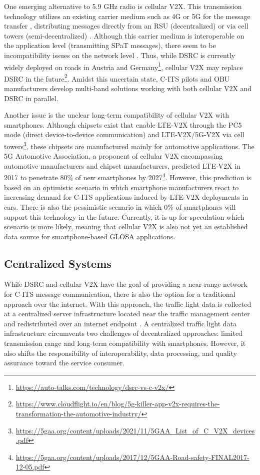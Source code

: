 One emerging alternative to 5.9 GHz radio is cellular V2X. This transmission technology utilizes an existing carrier medium such as 4G or 5G for the message transfer \cite{xia_field_2012, zweck_traffic_2013, bhattacharyya_assessing_2022}, distributing messages directly from an RSU (decentralized) \cite{bohm_radio_2017} or via cell towers (semi-decentralized) \cite{strobl_c-its_2019, jacob_ivs-kom_2020}. Although this carrier medium is interoperable on the application level (transmitting SPaT messages), there seem to be incompatibility issues on the network level \cite{bohm_radio_2017}. Thus, while DSRC is currently widely deployed on roads in Austria and Germany\footnote{\url{https://auto-talks.com/technology/dsrc-vs-c-v2x/}}, cellular V2X may replace DSRC in the future\footnote{\label{cloudflight-article}\url{https://www.cloudflight.io/en/blog/5g-killer-app-v2x-requires-the-transformation-the-automotive-industry/}}. Amidst this uncertain state, C-ITS pilots \cite{strobl_c-its_2019} and OBU manufacturers \cite{jacob_ivs-kom_2020} develop multi-band solutions working with both cellular V2X and DSRC in parallel.

Another issue is the unclear long-term compatibility of cellular V2X with smartphones. Although chipsets exist that enable LTE-V2X through the PC5 mode (direct device-to-device communication) and LTE-V2X/5G-V2X via cell towers\footnote{\url{https://5gaa.org/content/uploads/2021/11/5GAA_List_of_C_V2X_devices.pdf}}, these chipsets are manufactured mainly for automotive applications. The 5G Automotive Association, a proponent of cellular V2X encompassing automotive manufacturers and chipset manufacturers, predicted LTE-V2X in 2017 to penetrate 80\% of new smartphones by 2027\footnote{\url{https://5gaa.org/content/uploads/2017/12/5GAA-Road-safety-FINAL2017-12-05.pdf}}. However, this prediction is based on an optimistic scenario in which smartphone manufacturers react to increasing demand for C-ITS applications induced by LTE-V2X deployments in cars. There is also the pessimistic scenario in which 0\% of smartphones will support this technology in the future. Currently, it is up for speculation which scenario is more likely, meaning that cellular V2X is also not yet an established data source for smartphone-based GLOSA applications.

\subsection{Centralized Systems}

While DSRC and cellular V2X have the goal of providing a near-range network for C-ITS message communication, there is also the option for a traditional approach over the internet. With this approach, the traffic light data is collected at a centralized server infrastructure located near the traffic management center and redistributed over an internet endpoint \cite{zweck_traffic_2013, protschky_extensive_2014, protschky_adaptive_2014}. A centralized traffic light data infrastructure circumvents two challenges of decentralized approaches: limited transmission range and long-term compatibility with smartphones. However, it also shifts the responsibility of interoperability, data processing, and quality assurance toward the service consumer.

